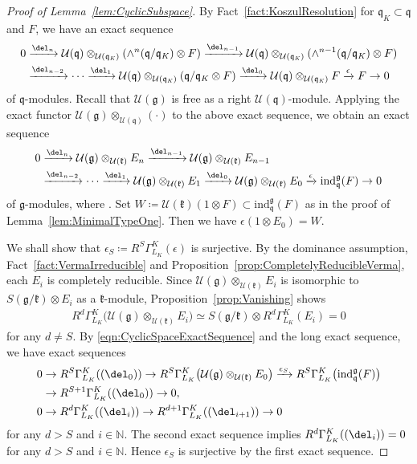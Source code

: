\documentclass[pdftex]{sigma}
\numberwithin{equation}{section}
\theoremstyle{definition}
\newcommand{\BasicRing}[1]{\mathbb{#1}}
\newcommand{\NN}{\BasicRing{N}}
\newcommand{\lieC}[1]{\mathfrak{#1}}
\newcommand{\lie}[1]{\mathfrak{#1}}
\newcommand{\univ}[1]{\mathcal{U}(\lieC{#1})}
\newcommand{\ind}[2]{\mathrm{ind}^{\lieC{#1}}_{\lieC{#2}}}
\newcommand{\zuck}[2]{\Gamma^{#1}_{#2}}
\newcommand{\Dzuck}[3]{R^{#3}\zuck{#1}{#2}}
\let\Im\relax
\DeclareMathOperator{\Im}{\mathrm{Im}}
\begin{document}
\begin{proof}[Proof of Lemma~\ref{lem:CyclicSubspace}]
	By Fact~\ref{fact:KoszulResolution} for $\lie{q}_K\subset \lie{q}$ and $F$, we have an exact sequence
	\begin{align*}
0&\xrightarrow{\del_n} \univ{q}\otimes_{\univ{q_\mathit{K}}}(\wedge^n (\lie{q/q_\mathit{K}})\otimes F)
		\xrightarrow{\del_{n-1}} \univ{q}\otimes_{\univ{q_\mathit{K}}}(\wedge^{n-1} (\lie{q/q_\mathit{K}})\otimes F)\\
		& \xrightarrow{\del_{n-2}} \cdots \xrightarrow{\del_{1}} \univ{q}\otimes_{\univ{q_\mathit{K}}}(\lie{q/q_\mathit{K}}\otimes F)
		\xrightarrow{\del_{0}} \univ{q}\otimes_{\univ{q_\mathit{K}}}F
		\xrightarrow{\epsilon} F \rightarrow 0
	\end{align*}
	of $\lie{q}$-modules.
	Recall that $\univ{g}$ is free as a right $\univ{q}$-module.
	Applying the exact functor $\univ{g}\otimes_{\univ{q}}(\cdot)$
	to the above exact sequence, we obtain an exact sequence
	\begin{align}
0&\xrightarrow{\del_n} \univ{g}\otimes_{\univ{k}}E_n
		\xrightarrow{\del_{n-1}} \univ{g}\otimes_{\univ{k}}E_{n-1} \nonumber\\
		& \xrightarrow{\del_{n-2}} \cdots \xrightarrow{\del_{1}} \univ{g}\otimes_{\univ{k}}E_1
		\xrightarrow{\del_{0}} \univ{g}\otimes_{\univ{k}}E_0
		\xrightarrow{\epsilon} \ind{g}{q}(F) \rightarrow 0 \label{eqn:CyclicSpaceExactSequence}
	\end{align}
	of $\lie{g}$-modules, where \smash{$E_i\coloneq\ind{k}{q_\mathit{K}}\bigl(\wedge^i (\lie{q/q_\mathit{K}})\otimes F\bigr)$}.
	Set $W \coloneq \univ{k}(1\otimes F) \subset \ind{g}{q}(F)$ as in the proof of Lemma~\ref{lem:MinimalTypeOne}.
	Then we have $\epsilon(1\otimes E_0)=W$.

	We shall show that $\epsilon_S\coloneq \Dzuck{K}{L_K}{S}(\epsilon)$ is surjective.
	By the dominance assumption, Fact~\ref{fact:VermaIrreducible} and Proposition~\ref{prop:CompletelyReducibleVerma}, each $E_i$ is completely reducible.
	Since $\univ{g}\otimes_{\univ{k}}E_i$
	is isomorphic to $S(\lie{g}/\lie{k})\otimes E_i$ as a $\lie{k}$-module, Proposition~\ref{prop:Vanishing} shows
	\begin{align*}
		\Dzuck{K}{L_K}{d}\bigl(\univ{g}\otimes_{\univ{k}}E_i\bigr)
		\simeq S(\lie{g/k})\otimes \Dzuck{K}{L_K}{d}(E_i) = 0
	\end{align*}
	for any $d \neq S$.
	By \eqref{eqn:CyclicSpaceExactSequence} and the long exact sequence, we have exact sequences
	\begin{align*}
		&0 \rightarrow \Dzuck{K}{L_K}{S}(\Im(\del_0))\rightarrow \Dzuck{K}{L_K}{S}\bigl(\univ{g}\otimes_{\univ{k}}E_0\bigr)
		\xrightarrow{\epsilon_S} \Dzuck{K}{L_K}{S}\bigl(\ind{g}{q}(F)\bigr)\\
		& \hphantom{0} \rightarrow \Dzuck{K}{L_K}{S+1}(\Im(\del_0)) \rightarrow 0, \\
		&0 \rightarrow \Dzuck{K}{L_K}{d}(\Im(\del_{i})) \rightarrow \Dzuck{K}{L_K}{d+1}(\Im(\del_{i+1})) \rightarrow 0
	\end{align*}
	for any $d > S$ and $i \in \NN$.
	The second exact sequence implies $\Dzuck{K}{L_K}{d}(\Im(\del_{i}))=0$ for any $d > S$ and $i \in \NN$.
	Hence $\epsilon_S$ is surjective by the first exact sequence.


\end{proof}
\end{document}
